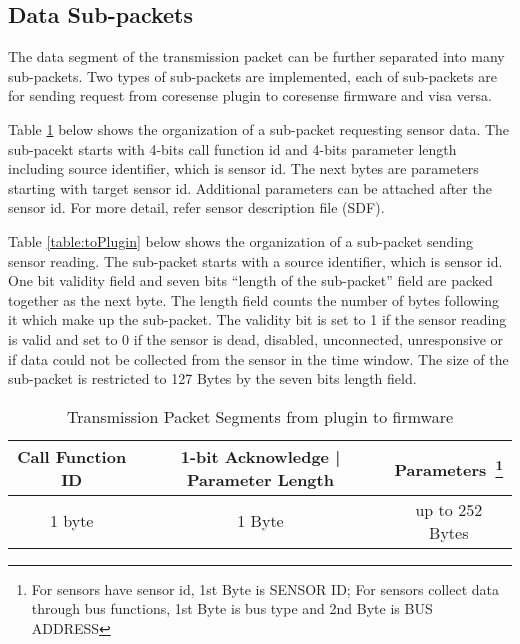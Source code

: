\subsection{Data Sub-packets} \label{ssec:sub-pack}

The data segment of the transmission packet can be further separated into many sub-packets.
Two types of sub-packets are implemented, each of sub-packets are for sending request from coresense plugin to coresense firmware and visa versa.

Table \ref{table:toFW} below shows the organization of a sub-packet requesting sensor data.
The sub-pacekt starts with 4-bits call function id and 4-bits parameter length including source identifier, which is sensor id. The next bytes are parameters starting with target sensor id. Additional parameters can be attached after the sensor id. For more detail, refer sensor description file (SDF).

Table \ref{table:toPlugin} below shows the organization of a sub-packet sending sensor reading.
The sub-packet starts with a source identifier, which is sensor id. One bit validity field and seven bits ``length of the sub-packet'' field are packed together as the next byte. The length field counts the number of bytes following it which make up the sub-packet. 
The validity bit is set to 1 if the sensor reading is valid and set to 0 if the sensor is dead, disabled, unconnected, unresponsive or if data could not be collected
from the sensor in the time window. The size of the sub-packet is restricted to 127 Bytes by the seven bits length field.
\\



\begin{table}[H]
\begin{minipage}{\textwidth}
    \centering
    {
    \begin{tabular}{|c|c|c|}
        \hline
        \rowcolor{black!8}
        \textbf{Call Function ID} & \textbf{1-bit Acknowledge | Parameter Length} & \textbf{Parameters~\footnote{For sensors have sensor id, 1st Byte is SENSOR ID; For sensors collect data through bus functions, 1st Byte is bus type and 2nd Byte is BUS ADDRESS}} \\ \hline
        1 byte & 1 Byte & up to 252 Bytes \\
        \hline
    \end{tabular}
    }
    \caption{Transmission Packet Segments from plugin to firmware}
    \label{table:toFW}
\end{minipage}
\end{table}


